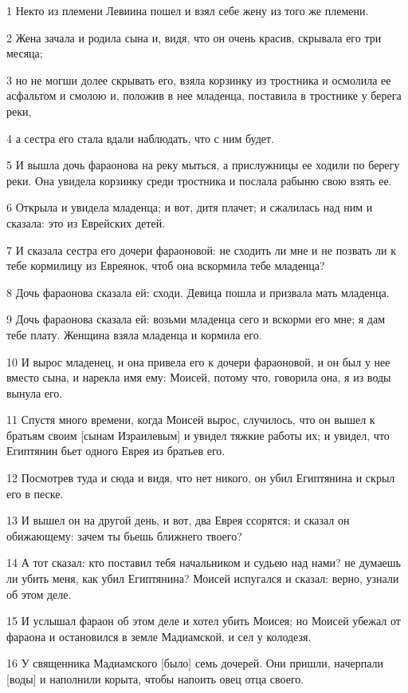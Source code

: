 \par 1 Некто из племени Левиина пошел и взял себе жену из того же племени.
\par 2 Жена зачала и родила сына и, видя, что он очень красив, скрывала его три месяца;
\par 3 но не могши долее скрывать его, взяла корзинку из тростника и осмолила ее асфальтом и смолою и, положив в нее младенца, поставила в тростнике у берега реки,
\par 4 а сестра его стала вдали наблюдать, что с ним будет.
\par 5 И вышла дочь фараонова на реку мыться, а прислужницы ее ходили по берегу реки. Она увидела корзинку среди тростника и послала рабыню свою взять ее.
\par 6 Открыла и увидела младенца; и вот, дитя плачет; и сжалилась над ним и сказала: это из Еврейских детей.
\par 7 И сказала сестра его дочери фараоновой: не сходить ли мне и не позвать ли к тебе кормилицу из Евреянок, чтоб она вскормила тебе младенца?
\par 8 Дочь фараонова сказала ей: сходи. Девица пошла и призвала мать младенца.
\par 9 Дочь фараонова сказала ей: возьми младенца сего и вскорми его мне; я дам тебе плату. Женщина взяла младенца и кормила его.
\par 10 И вырос младенец, и она привела его к дочери фараоновой, и он был у нее вместо сына, и нарекла имя ему: Моисей, потому что, говорила она, я из воды вынула его.
\par 11 Спустя много времени, когда Моисей вырос, случилось, что он вышел к братьям своим [сынам Израилевым] и увидел тяжкие работы их; и увидел, что Египтянин бьет одного Еврея из братьев его.
\par 12 Посмотрев туда и сюда и видя, что нет никого, он убил Египтянина и скрыл его в песке.
\par 13 И вышел он на другой день, и вот, два Еврея ссорятся; и сказал он обижающему: зачем ты бьешь ближнего твоего?
\par 14 А тот сказал: кто поставил тебя начальником и судьею над нами? не думаешь ли убить меня, как убил Египтянина? Моисей испугался и сказал: верно, узнали об этом деле.
\par 15 И услышал фараон об этом деле и хотел убить Моисея; но Моисей убежал от фараона и остановился в земле Мадиамской, и сел у колодезя.
\par 16 У священника Мадиамского [было] семь дочерей. Они пришли, начерпали [воды] и наполнили корыта, чтобы напоить овец отца своего.
